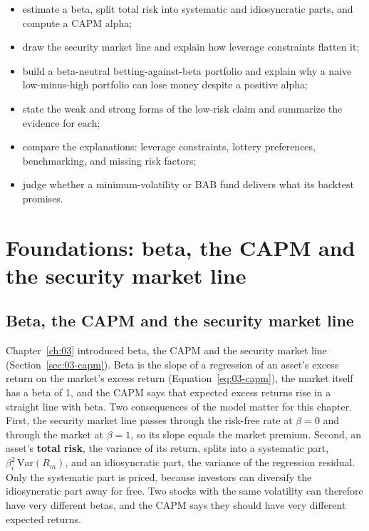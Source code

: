 \begin{itemize}
  \item estimate a beta, split total risk into systematic and idiosyncratic parts, and compute a CAPM alpha;
  \item draw the security market line and explain how leverage constraints flatten it;
  \item build a beta-neutral betting-against-beta portfolio and explain why a naive low-minus-high portfolio can lose money despite a positive alpha;
  \item state the weak and strong forms of the low-risk claim and summarize the evidence for each;
  \item compare the explanations: leverage constraints, lottery preferences, benchmarking, and missing risk factors;
  \item judge whether a minimum-volatility or BAB fund delivers what its backtest promises.
\end{itemize}

\section{Foundations: beta, the CAPM and the security market line}
\label{sec:12-foundations}

\subsection{Beta, the CAPM and the security market line}

Chapter~\ref{ch:03} introduced beta, the CAPM and the security market line (Section~\ref{sec:03-capm}). Beta is the slope of a regression of an asset's excess return on the market's excess return (Equation~\eqref{eq:03-capm}), the market itself has a beta of 1, and the CAPM says that expected excess returns rise in a straight line with beta. Two consequences of the model matter for this chapter. First, the security market line passes through the risk-free rate at $\beta = 0$ and through the market at $\beta = 1$, so its slope equals the market premium. Second, an asset's \textbf{total risk}, the variance of its return, splits into a systematic part, $\beta_i^2\,\mathrm{Var}(R_m)$, and an idiosyncratic part, the variance of the regression residual. Only the systematic part is priced, because investors can diversify the idiosyncratic part away for free. Two stocks with the same volatility can therefore have very different betas, and the CAPM says they should have very different expected returns.

